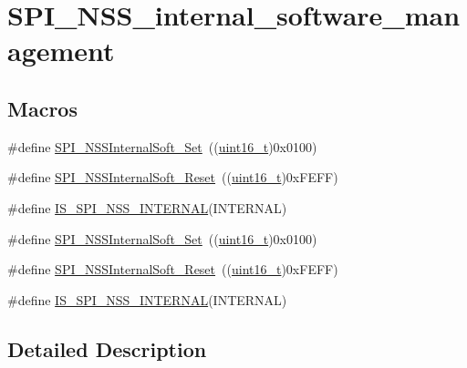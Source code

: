 \hypertarget{group___s_p_i___n_s_s__internal__software__management}{}\section{S\+P\+I\+\_\+\+N\+S\+S\+\_\+internal\+\_\+software\+\_\+management}
\label{group___s_p_i___n_s_s__internal__software__management}
\subsection*{Macros}
\begin{DoxyCompactItemize}
\item 
\#define \hyperlink{group___s_p_i___n_s_s__internal__software__management_ga6b2102816167d12140648dba49a192a7}{S\+P\+I\+\_\+\+N\+S\+S\+Internal\+Soft\+\_\+\+Set}~((\hyperlink{_p_e___types_8h_a1f1825b69244eb3ad2c7165ddc99c956}{uint16\+\_\+t})0x0100)
\item 
\#define \hyperlink{group___s_p_i___n_s_s__internal__software__management_ga292ec7bc0cd362d61b3b5eed620522c2}{S\+P\+I\+\_\+\+N\+S\+S\+Internal\+Soft\+\_\+\+Reset}~((\hyperlink{_p_e___types_8h_a1f1825b69244eb3ad2c7165ddc99c956}{uint16\+\_\+t})0x\+F\+E\+F\+F)
\item 
\#define \hyperlink{group___s_p_i___n_s_s__internal__software__management_ga7036de442206fb8b365528c115345b36}{I\+S\+\_\+\+S\+P\+I\+\_\+\+N\+S\+S\+\_\+\+I\+N\+T\+E\+R\+N\+AL}(I\+N\+T\+E\+R\+N\+AL)
\item 
\#define \hyperlink{group___s_p_i___n_s_s__internal__software__management_ga6b2102816167d12140648dba49a192a7}{S\+P\+I\+\_\+\+N\+S\+S\+Internal\+Soft\+\_\+\+Set}~((\hyperlink{_p_e___types_8h_a1f1825b69244eb3ad2c7165ddc99c956}{uint16\+\_\+t})0x0100)
\item 
\#define \hyperlink{group___s_p_i___n_s_s__internal__software__management_ga292ec7bc0cd362d61b3b5eed620522c2}{S\+P\+I\+\_\+\+N\+S\+S\+Internal\+Soft\+\_\+\+Reset}~((\hyperlink{_p_e___types_8h_a1f1825b69244eb3ad2c7165ddc99c956}{uint16\+\_\+t})0x\+F\+E\+F\+F)
\item 
\#define \hyperlink{group___s_p_i___n_s_s__internal__software__management_ga7036de442206fb8b365528c115345b36}{I\+S\+\_\+\+S\+P\+I\+\_\+\+N\+S\+S\+\_\+\+I\+N\+T\+E\+R\+N\+AL}(I\+N\+T\+E\+R\+N\+AL)
\end{DoxyCompactItemize}


\subsection{Detailed Description}


